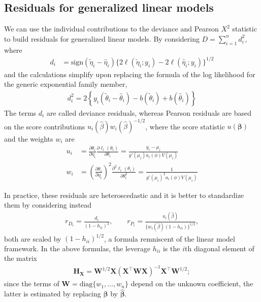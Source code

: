 \documentclass[
  11pt,
  letterpaper,
]{book}
\theoremstyle{definition}
\theoremstyle{definition}
\theoremstyle{definition}
\theoremstyle{definition}
\theoremstyle{remark}
\begin{document}
\hypertarget{residuals-glm}{%
\subsection{Residuals for generalized linear models}\label{residuals-glm}}

We can use the individual contributions to the deviance and Pearson
\(X^2\) statistic to build residuals for generalized linear models. By considering
\(D = \sum_{i=1}^n d_i^2\), where
\begin{align*}
d_i &= \mathrm{sign}(\widetilde{\eta}_i - \widehat{\eta}_i) \{2\ell(\widetilde{\eta}_i; y_i) - 2\ell(\widehat{\eta}_i; y_i)\}^{1/2}
\end{align*}
and the calculations simplify upon replacing the formula of
the log likelihood for the generic exponential family member,
\begin{align*}
d_i^2=2 \left\{y_i (\widetilde{\theta}_i - \widehat{\theta}_i) - b(\widetilde{\theta}_i) + b(\widehat{\theta}_i)\right\}
\end{align*}
The terms \(d_i\) are called deviance residuals, whereas
Pearson residuals are based on the score contributions
\(u_i(\widehat{\beta}) w_i(\widehat{\beta})^{-1/2}\), where the score statistic \(u(\boldsymbol{\beta})\) and the weights \(w_i\) are
\begin{align*}
u_i &= \frac{\partial \theta_i}{\partial \eta_i} \frac{\partial \ell_i(\theta_i)}{\partial \theta_i} = \frac{y_i - \mu_i}{g'(\mu_i)a_i(\phi)V(\mu_i)}\\
w_i &= \left(\frac{\partial \theta_i}{\partial \eta_i}\right)^2 \frac{\partial^2 \ell_i(\theta_i)}{\partial \theta_i^2} = \frac{1}{g'(\mu_i)^2 a_i(\phi)V(\mu_i)}
\end{align*}

In practice, these residuals are heteroscedastic and it is better to
standardize them by considering instead
\begin{align*}
r_{D_i} = \frac{d_i}{(1-h_{ii})^2}, \qquad r_{P_i} = \frac{u_i(\widehat{\beta})}{\{w_i(\widehat{\beta})(1-h_{ii})\}^{1/2}},
\end{align*}
both are scaled by \((1-h_{ii})^{1/2}\), a formula remniscent
of the linear model framework. In the above formulas, the leverage
\(h_{ii}\) is the \(i\)th diagonal element of the matrix \begin{align*}
\mathbf{H}_{\mathbf{X}} = \mathbf{W}^{1/2}\mathbf{X}(\mathbf{X}^\top\mathbf{W}\mathbf{X})^{-1} \mathbf{X}^\top\mathbf{W}^{1/2};
\end{align*}
since the terms of
\(\mathbf{W}=\mathrm{diag}\{w_1, \ldots, w_n\}\) depend on the unknown
coefficient, the latter is estimated by replacing \(\boldsymbol{\beta}\)
by \(\widehat{\boldsymbol{\beta}}\).
\end{document}
